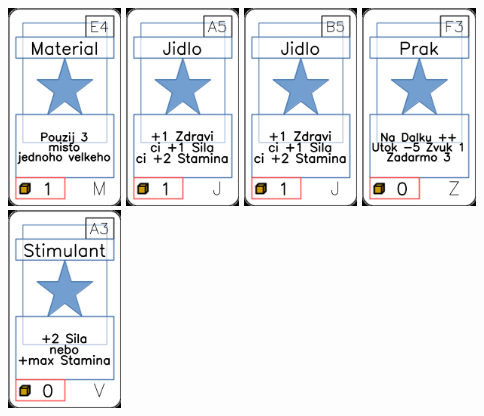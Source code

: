 \documentclass[a4paper]{article}
\begin{document}
	\includegraphics[width=3.0cm]{img-1_53}
	\includegraphics[width=3.0cm]{img-1_4}
	\includegraphics[width=3.0cm]{img-1_9}
	\includegraphics[width=3.0cm]{img-1_87}
	\includegraphics[width=3.0cm]{img-1_62}
\end{document}
